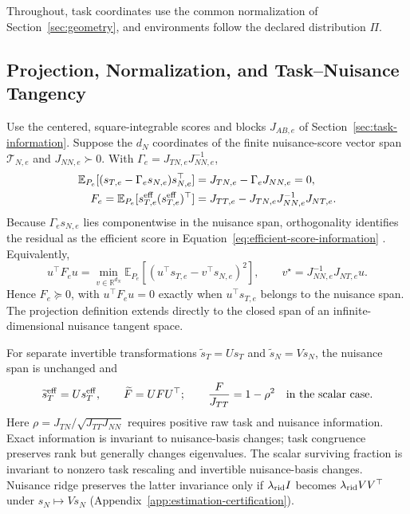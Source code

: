 Throughout, task coordinates use the common normalization of Section~\ref{sec:geometry}, and environments follow the declared distribution $\Pi$.

\subsection{Projection, Normalization, and Task--Nuisance Tangency}
\label{app:theory-projection}

Use the centered, square-integrable scores and blocks $J_{AB,e}$ of Section~\ref{sec:task-information}. Suppose the $d_N$ coordinates of the finite nuisance-score vector span $\mathcal T_{N,e}$ and $J_{NN,e}\succ0$. With $\Gamma_e=J_{TN,e}J_{NN,e}^{-1}$,
\begin{equation}
\begin{aligned}
\mathbb E_{P_e}[(s_{T,e}-\Gamma_es_{N,e})s_{N,e}^{\top}]&=J_{TN,e}-\Gamma_eJ_{NN,e}=0,\\
F_e=\mathbb E_{P_e}[s_{T,e}^{\mathrm{eff}}(s_{T,e}^{\mathrm{eff}})^{\top}]&=J_{TT,e}-J_{TN,e}J_{NN,e}^{-1}J_{NT,e}.
\end{aligned}
\label{eq:app-efficient-schur}
\end{equation}
Because $\Gamma_es_{N,e}$ lies componentwise in the nuisance span, orthogonality identifies the residual as the efficient score in Equation~\eqref{eq:efficient-score-information} \citep{bickel1993efficient,tsiatis2006semiparametric}. Equivalently,
\begin{equation}
u^{\top}F_eu=\min_{v\in\mathbb R^{d_N}}\mathbb E_{P_e}[(u^{\top}s_{T,e}-v^{\top}s_{N,e})^2],
\qquad v^\star=J_{NN,e}^{-1}J_{NT,e}u.
\label{eq:app-variational-schur}
\end{equation}
Hence $F_e\succeq0$, with $u^{\top}F_eu=0$ exactly when $u^{\top}s_{T,e}$ belongs to the nuisance span. The projection definition extends directly to the closed span of an infinite-dimensional nuisance tangent space.

For separate invertible transformations $\widetilde s_T=Us_T$ and $\widetilde s_N=Vs_N$, the nuisance span is unchanged and
\begin{equation}
\widetilde s_T^{\mathrm{eff}}=Us_T^{\mathrm{eff}},\qquad \widetilde F=UFU^{\top};
\qquad \frac{F}{J_{TT}}=1-\rho^2\quad\text{in the scalar case}.
\label{eq:app-coordinate-congruence}
\end{equation}
Here $\rho=J_{TN}/\sqrt{J_{TT}J_{NN}}$ requires positive raw task and nuisance information. Exact information is invariant to nuisance-basis changes; task congruence preserves rank but generally changes eigenvalues. The scalar surviving fraction is invariant to nonzero task rescaling and invertible nuisance-basis changes. Nuisance ridge preserves the latter invariance only if $\lambda_{\mathrm{rid}}I$ becomes $\lambda_{\mathrm{rid}}VV^\top$ under $s_N\mapsto Vs_N$ (Appendix~\ref{app:estimation-certification}).

